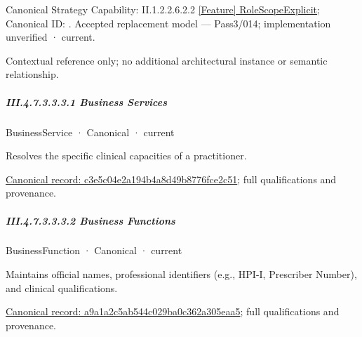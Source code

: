 {\small Canonical Strategy Capability: II.1.2.2.6.2.2 \hyperref[element:1541d71b5c924ed49e618f2496011c81]{[Feature] RoleScopeExplicit}; Canonical ID: \texttt{}. Accepted replacement model — Pass3/014; implementation unverified · current.}\par
Contextual reference only; no additional architectural instance or semantic relationship.\par
\subparagraph*{III.4.7.3.3.3.1 Business Services}
\label{navigation:III.4.7.3.3.3.1}

\label{navigation:III.4.7.3.3.3.1.1}

\label{element:c3e5c04e2a194b4a8d49b8776fce2c51}
{\small BusinessService · Canonical · current}\par

Resolves the specific clinical capacities of a practitioner.


{\footnotesize \href{../../../../../../../continuum/business/business-service/c3e5c04e2a194b4a8d49b8776fce2c51.md}{Canonical record: c3e5c04e2a194b4a8d49b8776fce2c51}; full qualifications and provenance.}\par
\subparagraph*{III.4.7.3.3.3.2 Business Functions}
\label{navigation:III.4.7.3.3.3.2}

\label{navigation:III.4.7.3.3.3.2.1}

\label{element:a9a1a2c5ab544c029ba0c362a305eaa5}
{\small BusinessFunction · Canonical · current}\par

Maintains official names, professional identifiers (e.g., HPI-I, Prescriber Number), and clinical qualifications.


{\footnotesize \href{../../../../../../../continuum/business/business-function/a9a1a2c5ab544c029ba0c362a305eaa5.md}{Canonical record: a9a1a2c5ab544c029ba0c362a305eaa5}; full qualifications and provenance.}\par
{}
\label{navigation:III.4.7.3.3.3.2.2}


